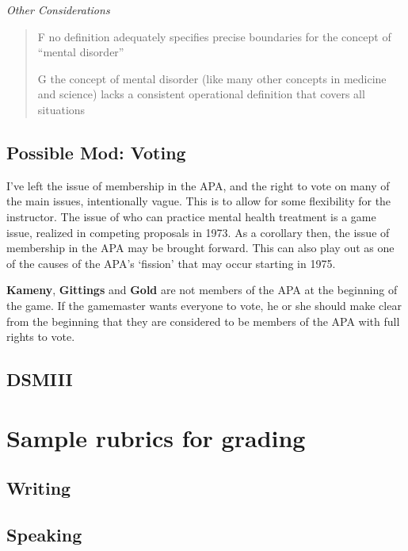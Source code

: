 \emph{Other Considerations}

\begin{quote}

F no definition adequately specifies precise boundaries for the concept of ``mental disorder''

G the concept of mental disorder (like many other concepts in medicine and science) lacks a consistent operational definition that covers all situations
\end{quote}

\subsection{Possible Mod: Voting}
\label{possiblemod:voting}

I've left the issue of membership in the APA, and the right to vote on many of the main issues, intentionally vague. This is to allow for some flexibility for the instructor. The issue of who can practice mental health treatment is a game issue, realized in competing proposals in 1973. As a corollary then, the issue of membership in the APA may be brought forward. This can also play out as one of the causes of the APA's `fission' that may occur starting in 1975.

\textbf{Kameny}, \textbf{Gittings} and \textbf{Gold} are not members of the APA at the beginning of the game. If the gamemaster wants everyone to vote, he or she should make clear from the beginning that they are considered to be members of the APA with full rights to vote.

\subsection{DSMIII}
\label{dsmiii}

\section{Sample rubrics for grading}
\label{samplerubricsforgrading}

\subsection{Writing}
\label{writing}

\subsection{Speaking}
\label{speaking}


